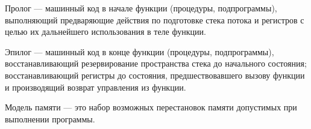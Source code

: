 Пролог --- машинный код в начале функции (процедуры, подпрограммы), выполняющий предваряющие действия по подготовке стека потока и регистров с целью их дальнейшего использования в теле функции. \cite{interpret}

Эпилог --- машинный код в конце функции (процедуры, подпрограммы), восстанавливающий резервирование пространства стека до начального состояния; восстанавливающий регистры до состояния, предшествовавшего вызову функции и производящий возврат управления из функции. \cite{interpret}

Модель памяти --- это набор возможных перестановок памяти допустимых при выполнении программы.


\pagebreak